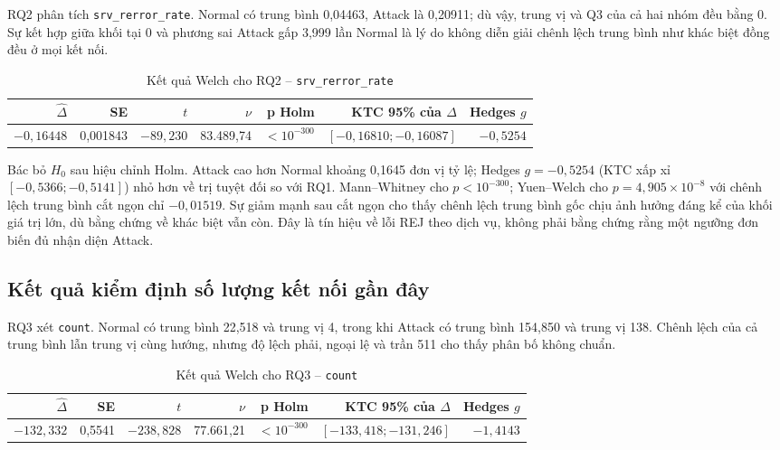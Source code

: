 RQ2 phân tích \texttt{srv\_rerror\_rate}. Normal có trung bình 0,04463, Attack là
0,20911; dù vậy, trung vị và Q3 của cả hai nhóm đều bằng 0. Sự kết hợp giữa khối tại 0
và phương sai Attack gấp 3,999 lần Normal là lý do không diễn giải chênh lệch trung
bình như khác biệt đồng đều ở mọi kết nối.

\begin{table}[H]
\centering
\caption{Kết quả Welch cho RQ2 -- \texttt{srv\_rerror\_rate}}
\label{tab:two-sample-rq2}
\small
\begin{tabular}{rrrrrrr}
\toprule
$\widehat\Delta$ & SE & $t$ & $\nu$ & p Holm & KTC 95\% của $\Delta$ & Hedges $g$ \\
\midrule
$-0{,}16448$ & 0,001843 & $-89{,}230$ & 83.489,74 & $<10^{-300}$ & $[-0{,}16810;-0{,}16087]$ & $-0{,}5254$ \\
\bottomrule
\end{tabular}
\end{table}

Bác bỏ $H_0$ sau hiệu chỉnh Holm. Attack cao hơn Normal khoảng 0,1645 đơn vị tỷ lệ;
Hedges $g=-0{,}5254$ (KTC xấp xỉ $[-0{,}5366;-0{,}5141]$) nhỏ hơn về trị tuyệt đối
so với RQ1. Mann--Whitney cho $p<10^{-300}$; Yuen--Welch cho
$p=4{,}905\times10^{-8}$ với chênh lệch trung bình cắt ngọn chỉ $-0{,}01519$. Sự
giảm mạnh sau cắt ngọn cho thấy chênh lệch trung bình gốc chịu ảnh hưởng đáng kể của
khối giá trị lớn, dù bằng chứng về khác biệt vẫn còn. Đây là tín hiệu về lỗi REJ theo
dịch vụ, không phải bằng chứng rằng một ngưỡng đơn biến đủ nhận diện Attack.

\subsection{Kết quả kiểm định số lượng kết nối gần đây}
\label{subsec:two-sample-rq3}

RQ3 xét \texttt{count}. Normal có trung bình 22,518 và trung vị 4, trong khi Attack
có trung bình 154,850 và trung vị 138. Chênh lệch của cả trung bình lẫn trung vị cùng
hướng, nhưng độ lệch phải, ngoại lệ và trần 511 cho thấy phân bố không chuẩn.

\begin{table}[H]
\centering
\caption{Kết quả Welch cho RQ3 -- \texttt{count}}
\label{tab:two-sample-rq3}
\small
\begin{tabular}{rrrrrrr}
\toprule
$\widehat\Delta$ & SE & $t$ & $\nu$ & p Holm & KTC 95\% của $\Delta$ & Hedges $g$ \\
\midrule
$-132{,}332$ & 0,5541 & $-238{,}828$ & 77.661,21 & $<10^{-300}$ & $[-133{,}418;-131{,}246]$ & $-1{,}4143$ \\
\bottomrule
\end{tabular}
\end{table}


